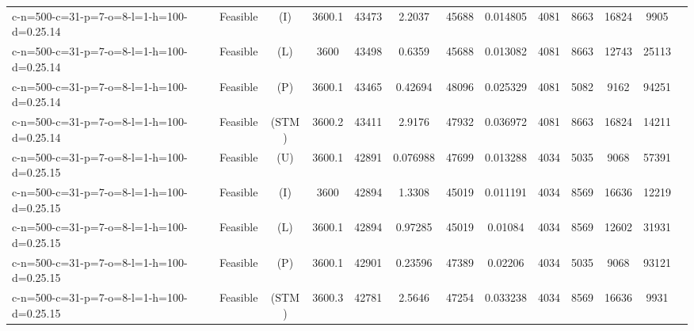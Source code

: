 \documentclass[landscape, a4paper]{article}
\newcommand{\STM}{\ensuremath{\mathrm{STM}}}
\newcommand{\Improved}{\ensuremath{\mathrm{I}}}
\newcommand{\Loose}{\ensuremath{\mathrm{L}}}
\newcommand{\Profit}{\ensuremath{\mathrm{P}}}
\newcommand{\Utility}{\ensuremath{\mathrm{U}}}
\begin{document}
\begin{center}
\begin{tabular}{lcccccccccccc}
c-n=500-c=31-p=7-o=8-l=1-h=100-d=0.25.14 & Feasible & (\Improved) & 3600.1 & 43473 & 2.2037 & 45688 & 0.014805 & 4081 & 8663 & 16824 & 9905 & \\
c-n=500-c=31-p=7-o=8-l=1-h=100-d=0.25.14 & Feasible & (\Loose) & 3600 & 43498 & 0.6359 & 45688 & 0.013082 & 4081 & 8663 & 12743 & 25113 & \\
c-n=500-c=31-p=7-o=8-l=1-h=100-d=0.25.14 & Feasible & (\Profit) & 3600.1 & 43465 & 0.42694 & 48096 & 0.025329 & 4081 & 5082 & 9162 & 94251 & \\
c-n=500-c=31-p=7-o=8-l=1-h=100-d=0.25.14 & Feasible & (\STM) & 3600.2 & 43411 & 2.9176 & 47932 & 0.036972 & 4081 & 8663 & 16824 & 14211 & \\
c-n=500-c=31-p=7-o=8-l=1-h=100-d=0.25.15 & Feasible & (\Utility) & 3600.1 & 42891 & 0.076988 & 47699 & 0.013288 & 4034 & 5035 & 9068 & 57391 & \\
c-n=500-c=31-p=7-o=8-l=1-h=100-d=0.25.15 & Feasible & (\Improved) & 3600 & 42894 & 1.3308 & 45019 & 0.011191 & 4034 & 8569 & 16636 & 12219 & \\
c-n=500-c=31-p=7-o=8-l=1-h=100-d=0.25.15 & Feasible & (\Loose) & 3600.1 & 42894 & 0.97285 & 45019 & 0.01084 & 4034 & 8569 & 12602 & 31931 & \\
c-n=500-c=31-p=7-o=8-l=1-h=100-d=0.25.15 & Feasible & (\Profit) & 3600.1 & 42901 & 0.23596 & 47389 & 0.02206 & 4034 & 5035 & 9068 & 93121 & \\
c-n=500-c=31-p=7-o=8-l=1-h=100-d=0.25.15 & Feasible & (\STM) & 3600.3 & 42781 & 2.5646 & 47254 & 0.033238 & 4034 & 8569 & 16636 & 9931 & \\
\end{tabular}
\end{center}
\end{document}
